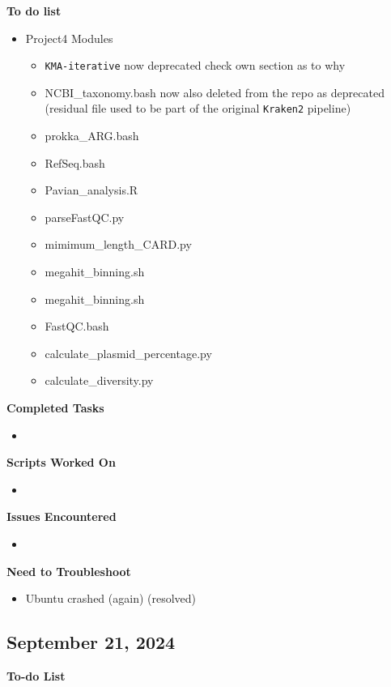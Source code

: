 \documentclass[11pt]{report}
\newcommand{\done}{\checkmark}
\begin{document}
{\begin{multicols}{2}
\textbf{To do list}
\begin{itemize}
	\item [\done] Project4 Modules
	\begin{itemize}
		\item [\done] \texttt{KMA-iterative} now deprecated check own section as to why
		\item [\done] NCBI\_taxonomy.bash now also deleted from the repo as deprecated (residual file used to be part of the original \texttt{Kraken2} pipeline)
		\item [\done] prokka\_ARG.bash
		\item [\done] RefSeq.bash
		\item [\done] Pavian\_analysis.R
		\item [\done] parseFastQC.py
		\item [\done] mimimum\_length\_CARD.py
		\item [\done] megahit\_binning.sh
		\item [\done] megahit\_binning.sh
		\item [\done] FastQC.bash
		\item [\done] calculate\_plasmid\_percentage.py
		\item [\done] calculate\_diversity.py
	\end{itemize}
\end{itemize}


\textbf{Completed Tasks} 
\begin{itemize}
	\item
\end{itemize}

\textbf{Scripts Worked On}
\begin{itemize}
	\item 
\end{itemize}


\textbf{Issues Encountered}
\begin{itemize}
	\item  
\end{itemize}

\textbf{Need to Troubleshoot}
\begin{itemize}
	\item [\done] Ubuntu crashed (again) (resolved)
\end{itemize}
\end{multicols}

\newpage

\begin{multicols}{2}
\section{September 21, 2024}
\textbf{To-do List} \\



\end{multicols}}
\end{document}
